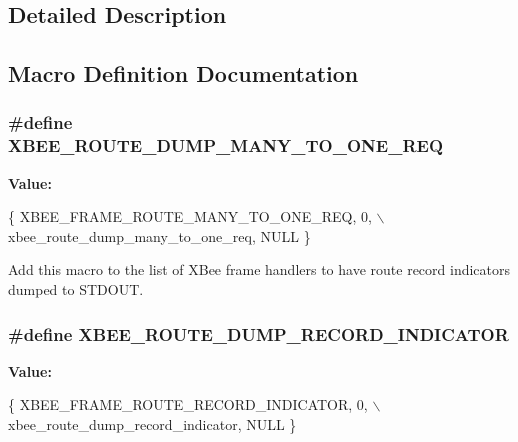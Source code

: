 \subsection{Detailed Description}


\subsection{Macro Definition Documentation}
\hypertarget{group__xbee__route_gab9293f39692e0bc50896eed12ef89d4e}{
\subsubsection[{X\-B\-E\-E\-\_\-\-R\-O\-U\-T\-E\-\_\-\-D\-U\-M\-P\-\_\-\-M\-A\-N\-Y\-\_\-\-T\-O\-\_\-\-O\-N\-E\-\_\-\-R\-E\-Q}]{\setlength{\rightskip}{0pt plus 5cm}\#define X\-B\-E\-E\-\_\-\-R\-O\-U\-T\-E\-\_\-\-D\-U\-M\-P\-\_\-\-M\-A\-N\-Y\-\_\-\-T\-O\-\_\-\-O\-N\-E\-\_\-\-R\-E\-Q}}\label{group__xbee__route_gab9293f39692e0bc50896eed12ef89d4e}
{\bfseries Value\-:}
\begin{DoxyCode}
\{  XBEE\_FRAME\_ROUTE\_MANY\_TO\_ONE\_REQ, 0, \(\backslash\)
      xbee\_route\_dump\_many\_to\_one\_req, NULL \}
\end{DoxyCode}


Add this macro to the list of X\-Bee frame handlers to have route record indicators dumped to S\-T\-D\-O\-U\-T. 

\hypertarget{group__xbee__route_ga47ed8d34bae2282e8397becffbe212fb}{
\subsubsection[{X\-B\-E\-E\-\_\-\-R\-O\-U\-T\-E\-\_\-\-D\-U\-M\-P\-\_\-\-R\-E\-C\-O\-R\-D\-\_\-\-I\-N\-D\-I\-C\-A\-T\-O\-R}]{\setlength{\rightskip}{0pt plus 5cm}\#define X\-B\-E\-E\-\_\-\-R\-O\-U\-T\-E\-\_\-\-D\-U\-M\-P\-\_\-\-R\-E\-C\-O\-R\-D\-\_\-\-I\-N\-D\-I\-C\-A\-T\-O\-R}}\label{group__xbee__route_ga47ed8d34bae2282e8397becffbe212fb}
{\bfseries Value\-:}
\begin{DoxyCode}
\{  XBEE\_FRAME\_ROUTE\_RECORD\_INDICATOR, 0, \(\backslash\)
      xbee\_route\_dump\_record\_indicator, NULL \}
\end{DoxyCode}


